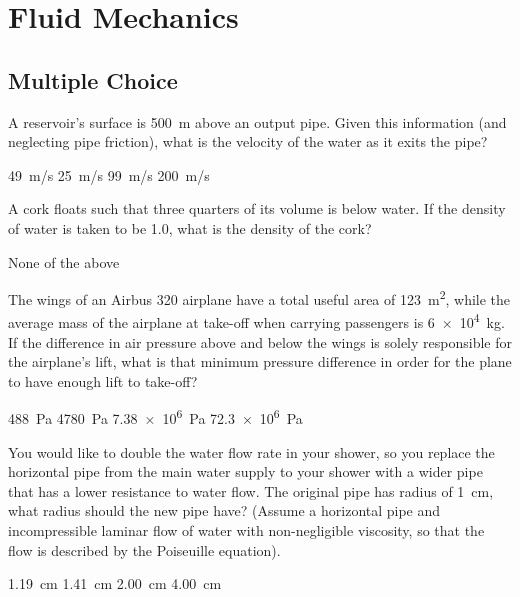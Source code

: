 \section{Fluid Mechanics}

\subsection{Multiple Choice}

\question A reservoir's surface is \SI{500}{m} above an output pipe. Given this information (and neglecting pipe friction), what is the velocity of the water as it exits the pipe?
\begin{checkboxes}
	\choice \SI{49}{m/s}
	\choice \SI{25}{m/s}
	\CorrectChoice \SI{99}{m/s} \correct
	\choice \SI{200}{m/s}
\end{checkboxes}

\question A cork floats such that three quarters of its volume is below water. If the density of water is taken to be 1.0, what is the density of the cork?
\begin{checkboxes}
	\choice None of the above
\end{checkboxes}

\question The wings of an Airbus 320 airplane have a total useful area of \SI{123}{m^2}, while the average mass of the airplane at take-off when carrying passengers is \SI{6e4}{kg}. If the difference in air pressure above and below the wings is solely responsible for the airplane's lift, what is that minimum pressure difference in order for the plane to have enough lift to take-off?
\begin{checkboxes} 
	\choice \SI{488}{Pa}
	\CorrectChoice \SI{4780}{Pa}
	\choice  \SI{7.38e6}{Pa}
	\choice \SI{72.3e6}{Pa}
\end{checkboxes}

\question You would like to double the water flow rate in your shower, so you replace the horizontal pipe from the main water supply to your shower with a wider pipe that has a lower resistance to water flow. The original pipe has radius of \SI{1}{cm}, what radius should the new pipe have? (Assume a horizontal pipe and incompressible laminar flow of water with non-negligible viscosity, so that the flow is described by the Poiseuille equation).
\begin{checkboxes}
	\CorrectChoice \SI{1.19}{cm}
	\choice \SI{1.41}{cm}
	\choice \SI{2.00}{cm}
	\choice \SI{4.00}{cm}
\end{checkboxes}

